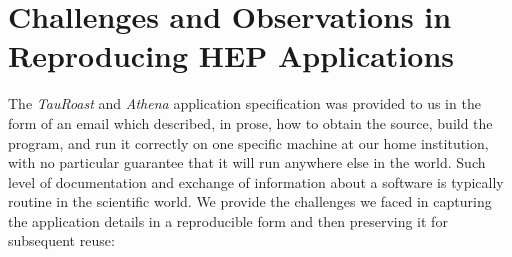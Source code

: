 \section{Challenges and Observations in Reproducing HEP Applications}

The \emph{TauRoast} and \emph{Athena} application specification was provided to us in the form of an
email which described, in prose, how to obtain the source,
build the program, and run it correctly on one specific
machine at our home institution, with no particular guarantee that
it will run anywhere else in the world. Such level of documentation and exchange of information about a software is typically routine in the scientific world. 
We provide the challenges we faced in capturing the application details in a reproducible form and then preserving it for subsequent reuse:

%
%


